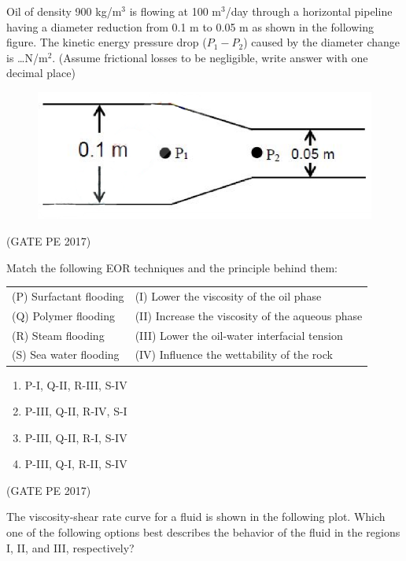 \documentclass[journal,12pt,onecolumn]{IEEEtran}
\theoremstyle{remark}
\begin{document}
\begin{enumerate}
{\item Oil of density 900 kg/m$^3$ is flowing at 100 m$^3$/day through a horizontal pipeline having a diameter reduction from 0.1 m to 0.05 m as shown in the following figure.
The kinetic energy pressure drop ($P_1 - P_2$) caused by the diameter change is \dots N/m$^2$.
(Assume frictional losses to be negligible, write answer with one decimal place)\\
\begin{figure}[h]
    \centering
    \includegraphics[width=0.5\columnwidth]{figQ_39.png}
    \caption{}
    \label{fig:placeholder}
\end{figure}
\hfill{(GATE PE 2017)}

\item Match the following EOR techniques and the principle behind them:\\

\begin{tabular}{ll}
(P) Surfactant flooding & (I) Lower the viscosity of the oil phase \\
(Q) Polymer flooding & (II) Increase the viscosity of the aqueous phase \\
(R) Steam flooding & (III) Lower the oil-water interfacial tension \\
(S) Sea water flooding & (IV) Influence the wettability of the rock \\
\end{tabular}
\begin{enumerate}
\item P-I, Q-II, R-III, S-IV \\
\item P-III, Q-II, R-IV, S-I \\
\item P-III, Q-II, R-I, S-IV \\
\item P-III, Q-I, R-II, S-IV
\end{enumerate}
\hfill{(GATE PE 2017)}

\item The viscosity-shear rate curve for a fluid is shown in the following plot. Which one of the following options best describes the behavior of the fluid in the regions I, II, and III, respectively?

}
\end{enumerate}
\end{document}
